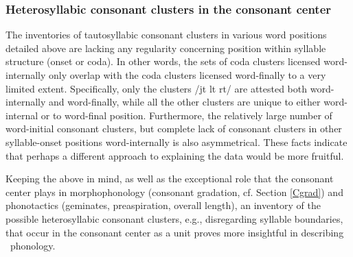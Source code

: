 \subsubsection[Heterosyllabic CCs in the consonant center]{Heterosyllabic consonant clusters in the consonant center}\label{consecutiveCs}
The inventories of tautosyllabic consonant clusters in various word positions detailed above are lacking any regularity concerning position within syllable structure (onset or coda). In other words, the sets of coda clusters licensed word-internally only overlap with the coda clusters licensed word-finally to a very limited extent. Specifically, only the clusters /jt lt rt/ are attested both word-internally and word-finally, while all the other clusters are unique to either word-internal or to word-final position. 
Furthermore, the relatively large number of word-initial consonant clusters, but complete lack of consonant clusters in other syllable-onset positions word-internally is also asymmetrical. 
These facts indicate that perhaps a different approach to explaining the data would be more fruitful. 

Keeping the above in mind, as well as the exceptional role that the consonant center plays in morphophonology (consonant gradation, cf. Section \ref{Cgrad}) and phonotactics (geminates, preaspiration, overall length), an inventory of the possible heterosyllabic consonant clusters, e.g., disregarding syllable boundaries, that occur in the consonant center as a unit proves more insightful in describing \PS\ phonology. 

